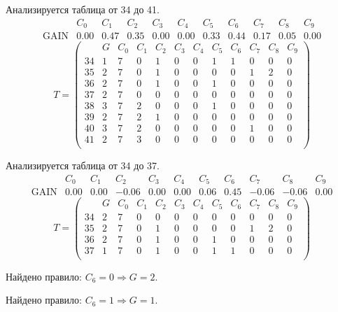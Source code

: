 Анализируется таблица от 34 до 41.
$$ 
\begin{array}{lc|c|cccccccc}
	  & C_{0} & C_{1} & C_{2} & C_{3} & C_{4} & C_{5} & C_{6} & C_{7} & C_{8} & C_{9}\\
 \textrm{GAIN} & 0.00 & 0.47 & 0.35 & 0.00 & 0.00 & 0.33 & 0.44 & 0.17 & 0.05 & 0.00
\end{array}
 $$
$$
T = \left( \begin{array}{lcc|c|cccccccc}
	 & G & C_{0} & C_{1} & C_{2} & C_{3} & C_{4} & C_{5} & C_{6} & C_{7} & C_{8} & C_{9}\\
	34 & 1 & 7 & 0 & 1 & 0 & 0 & 1 & 1 & 0 & 0 & 0\\
	35 & 2 & 7 & 0 & 1 & 0 & 0 & 0 & 0 & 1 & 2 & 0\\
	36 & 2 & 7 & 0 & 1 & 0 & 0 & 1 & 0 & 0 & 0 & 0\\
	37 & 2 & 7 & 0 & 0 & 0 & 0 & 0 & 0 & 0 & 0 & 0\\
	38 & 3 & 7 & 2 & 0 & 0 & 0 & 1 & 0 & 0 & 0 & 0\\
	39 & 2 & 7 & 2 & 1 & 0 & 0 & 0 & 0 & 0 & 0 & 0\\
	40 & 3 & 7 & 2 & 0 & 0 & 0 & 0 & 0 & 1 & 0 & 0\\
	41 & 2 & 7 & 3 & 0 & 0 & 0 & 0 & 0 & 0 & 0 & 0\\
\end{array} \right)
$$

Анализируется таблица от 34 до 37.
$$ 
\begin{array}{lcccccc|c|ccc}
	  & C_{0} & C_{1} & C_{2} & C_{3} & C_{4} & C_{5} & C_{6} & C_{7} & C_{8} & C_{9}\\
 \textrm{GAIN} & 0.00 & 0.00 & -0.06 & 0.00 & 0.00 & 0.06 & 0.45 & -0.06 & -0.06 & 0.00
\end{array}
 $$
$$
T = \left( \begin{array}{lccccccc|c|ccc}
	 & G & C_{0} & C_{1} & C_{2} & C_{3} & C_{4} & C_{5} & C_{6} & C_{7} & C_{8} & C_{9}\\
	34 & 2 & 7 & 0 & 0 & 0 & 0 & 0 & 0 & 0 & 0 & 0\\
	35 & 2 & 7 & 0 & 1 & 0 & 0 & 0 & 0 & 1 & 2 & 0\\
	36 & 2 & 7 & 0 & 1 & 0 & 0 & 1 & 0 & 0 & 0 & 0\\
	37 & 1 & 7 & 0 & 1 & 0 & 0 & 1 & 1 & 0 & 0 & 0\\
\end{array} \right)
$$

Найдено правило: $C_{6} = 0 \Longrightarrow G = 2$.

Найдено правило: $C_{6} = 1 \Longrightarrow G = 1$.

